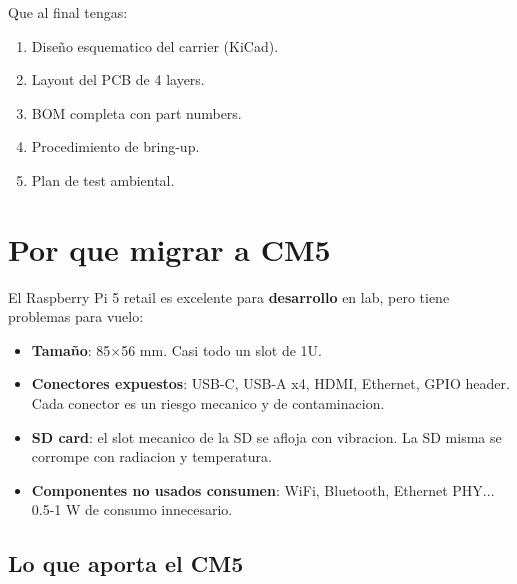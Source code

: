 \documentclass[11pt,a4paper,oneside,openright]{book}
\begin{document}
Que al final tengas:
\begin{enumerate}[leftmargin=2em]
  \item Diseño esquematico del carrier (KiCad).
  \item Layout del PCB de 4 layers.
  \item BOM completa con part numbers.
  \item Procedimiento de bring-up.
  \item Plan de test ambiental.
\end{enumerate}

\tableofcontents

\mainmatter

\chapter{Por que migrar a CM5}

El Raspberry Pi 5 retail es excelente para \textbf{desarrollo} en lab,
pero tiene problemas para vuelo:

\begin{itemize}[leftmargin=2em]
  \item \textbf{Tamaño}: 85$\times$56 mm. Casi todo un slot de 1U.
  \item \textbf{Conectores expuestos}: USB-C, USB-A x4, HDMI, Ethernet,
        GPIO header. Cada conector es un riesgo mecanico y de
        contaminacion.
  \item \textbf{SD card}: el slot mecanico de la SD se afloja con
        vibracion. La SD misma se corrompe con radiacion y temperatura.
  \item \textbf{Componentes no usados consumen}: WiFi, Bluetooth,
        Ethernet PHY... 0.5-1 W de consumo innecesario.
\end{itemize}

\section{Lo que aporta el CM5}
\end{document}
